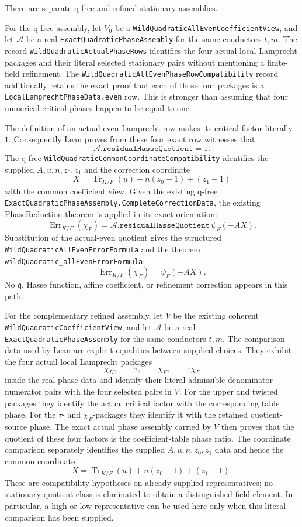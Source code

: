 \begin{theorem}\label{mod:cases-wildquadratic-errorformula}
There are separate q-free and refined stationary assemblies.

For the q-free assembly, let \(V_0\) be a
\texttt{WildQuadraticAllEvenCoefficientView}, and let \(\mathcal A\) be a
real \texttt{ExactQuadraticPhaseAssembly} for the same conductors \(t,m\).
The record \texttt{WildQuadraticActualPhaseRows} identifies the four actual
local Lamprecht packages and their literal selected stationary pairs without
mentioning a finite-field refinement.  The
\texttt{WildQuadraticAllEvenPhaseRowCompatibility} record additionally
retains the exact proof that each of those four packages is a
\texttt{LocalLamprechtPhaseData.even} row.  This is stronger than assuming
that four numerical critical phases happen to be equal to one.

The definition of an actual even Lamprecht row makes its critical factor
literally \(1\).  Consequently Lean proves from these four exact row
witnesses that
\[
 \mathcal A.\texttt{residualHasseQuotient}=1.
\]
The q-free \texttt{WildQuadraticCommonCoordinateCompatibility} identifies
the supplied \(A,u,n,z_0,z_1\) and the correction coordinate
\[
 X=\operatorname{Tr}_{K/F}(u)+n(z_0-1)+(z_1-1)
\]
with the common coefficient view.  Given the existing q-free
\texttt{ExactQuadraticPhaseAssembly.CompleteCorrectionData}, the existing
PhaseReduction theorem is applied in its exact orientation:
\[
 \operatorname{Err}_{K/F}(\chi_F)
 =\mathcal A.\texttt{residualHasseQuotient}\,
   \psi_F(-AX).
\]
Substitution of the actual-even quotient gives the structured
\texttt{WildQuadraticAllEvenErrorFormula} and the theorem
\texttt{wildQuadratic\_allEvenErrorFormula}:
\[
 \operatorname{Err}_{K/F}(\chi_F)=\psi_F(-AX).
\]
No \(\mathfrak q\), Hasse function, affine coefficient, or refinement
correction appears in this path.

For the complementary refined assembly, let \(V\) be the existing coherent
\texttt{WildQuadraticCoefficientView}, and let \(\mathcal A\) be a real
\texttt{ExactQuadraticPhaseAssembly} for the same conductors \(t,m\).
The comparison data used by Lean are explicit equalities between supplied
choices.  They exhibit the four actual local Lamprecht packages
\[
  \chi_K,\qquad \tau,\qquad \chi_F,\qquad \tau\chi_F
\]
inside the real phase data and identify their literal admissible
denominator--numerator pairs with the four selected pairs in \(V\).
For the upper and twisted packages they identify the actual critical factor
with the corresponding table phase.  For the \(\tau\)- and \(\chi_F\)-packages
they identify it with the retained quotient-source phase.  The exact actual
phase assembly carried by \(V\) then proves that the quotient of these four
factors is the coefficient-table phase ratio.  The coordinate comparison
separately identifies the supplied \(A,u,n,z_0,z_1\) data and hence the common
coordinate
\[
 X=\operatorname{Tr}_{K/F}(u)+n(z_0-1)+(z_1-1).
\]
These are compatibility hypotheses on already supplied representatives; no
stationary quotient class is eliminated to obtain a distinguished field
element.  In particular, a high or low representative can be used here only
when this literal comparison has been supplied.


\end{theorem}
